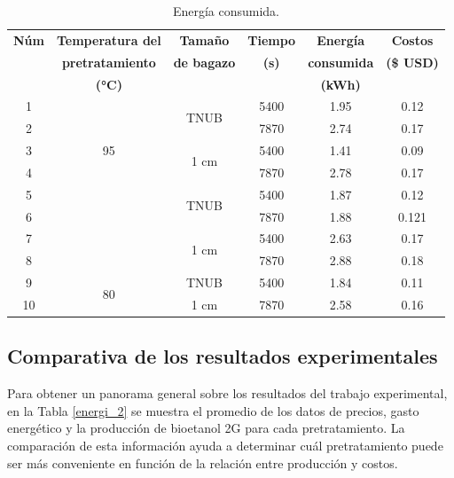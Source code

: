 \documentclass[12pt]{article}
\begin{document}
	\begin{table}[H]
		\centering
		\label{energi_}
		\caption{Energía consumida. }
		{\fontsize{9}{10.8}\selectfont
			\begin{tabular}{|c|c|c|c|c|c|}
				\hline
			\textbf{Núm}	&\textbf{Temperatura del} & \textbf{Tamaño } & \textbf{Tiempo} & \textbf{Energía } & \textbf{Costos } \\ 
				&\textbf{pretratamiento} &	\textbf{ de bagazo}  &	\textbf{ (s)} & 	\textbf{consumida  }& 	\textbf{(\$ USD)} \\ 
				&\textbf{(°C)}  &  &  & \textbf{(kWh)} &  \\ \hline
			1	&\multirow{5}{*}{95} &\multirow{2}{*}{ TNUB} & 5400 & 1.95 & 0.12 \\ \cline{4-6}\cline{1-1}
			2	&&  & 7870& 2.74 & 0.17  \\ \cline{3-6}\cline{1-1}
		3	&	& \multirow{2}{*}{ 1 cm}& 5400  & 1.41 & 0.09  \\ \cline{4-6}\cline{1-1}
		4	&	&   & 7870 & 2.78 & 0.17  \\ \hline
		5	&	\multirow{5}{*}{90}	 & \multirow{2}{*}{TNUB} & 5400 & 1.87 & 0.12 \\ \cline{4-6}\cline{1-1}
		6	&	 &  & 7870 & 1.88 & 0.121 \\ \cline{3-6}\cline{1-1}
		7	&	 & \multirow{2}{*}{1 cm} & 5400 & 2.63 & 0.17 \\ \cline{4-6}\cline{1-1}
		8	&	& & 7870 & 2.88 & 0.18  \\ \hline
	9	&		\multirow{2}{*}{80}	 & TNUB & 5400 & 1.84 &0.11   \\ \cline{3-6}\cline{1-1}
		10	&	 & 1 cm & 7870 & 2.58 & 0.16 \\ \hline
		\end{tabular}}
		
	\end{table}
	
	
	
	
	
		\subsection{Comparativa de los resultados experimentales}
	
	Para obtener un panorama general sobre los resultados del trabajo experimental, en la Tabla \ref{energi_2} se muestra el promedio de los datos de precios, gasto energético y la producción de bioetanol 2G para cada pretratamiento. La comparación de esta información ayuda a determinar cuál pretratamiento puede ser más conveniente en función de la relación entre producción y costos.
	
\end{document}
